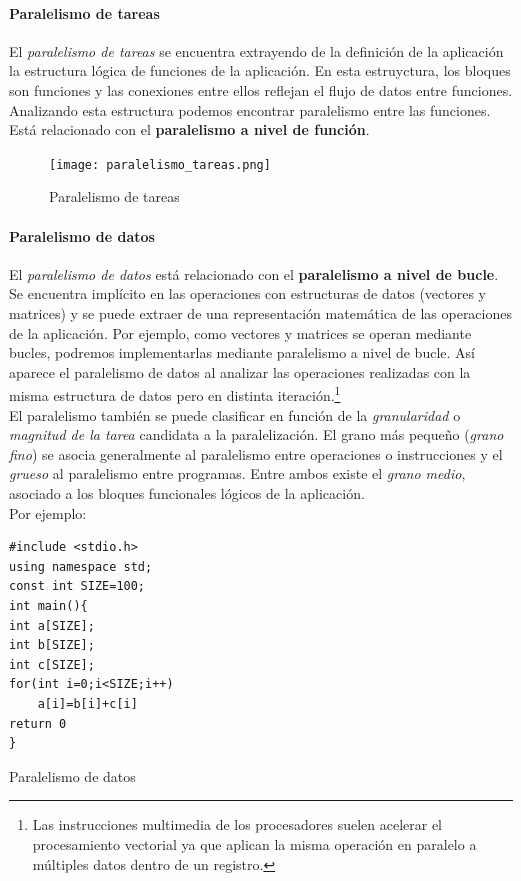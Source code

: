 \documentclass[12pt,spanish]{article}
\begin{document}
\paragraph{Paralelismo de tareas}

El \emph{paralelismo de tareas} se encuentra extrayendo de la definición de la aplicación la estructura lógica de funciones de la aplicación. En esta estruyctura, los bloques son funciones y las conexiones entre ellos reflejan el flujo de datos entre funciones. Analizando esta estructura podemos encontrar paralelismo entre las funciones.\\
Está relacionado con el \textbf{paralelismo a nivel de función}.
\begin{figure}[H]
\centering
\texttt{[image: paralelismo\_tareas.png]}
\caption{Paralelismo de tareas}
\end{figure}

\paragraph{Paralelismo de datos}

El \emph{paralelismo de datos} está relacionado con el \textbf{paralelismo a nivel de bucle}. Se encuentra implícito en las operaciones con estructuras de datos (vectores y matrices) y se puede extraer de una representación matemática de las operaciones de la aplicación. Por ejemplo, como vectores y matrices se operan mediante bucles, podremos implementarlas mediante paralelismo a nivel de bucle. Así aparece el paralelismo de datos al analizar las operaciones realizadas con la misma estructura de datos pero en distinta iteración.\footnote{Las instrucciones multimedia de los procesadores suelen acelerar el procesamiento vectorial ya que aplican la misma operación en paralelo a múltiples datos dentro de un registro.}\\
El paralelismo también se puede clasificar en función de la \emph{granularidad} o \emph{magnitud de la tarea} candidata a la paralelización. El grano más pequeño (\textit{grano fino}) se asocia generalmente al paralelismo entre operaciones o instrucciones y el \textit{grueso} al paralelismo entre programas. Entre ambos existe el \textit{grano medio}, asociado a los bloques funcionales lógicos de la aplicación.\\
Por ejemplo:
\begin{listing}[H]
\begin{verbatim}
#include <stdio.h>
using namespace std;
const int SIZE=100;
int main(){
int a[SIZE];
int b[SIZE];
int c[SIZE];
for(int i=0;i<SIZE;i++)
	a[i]=b[i]+c[i]
return 0
}
\end{verbatim}
\caption{Paralelismo de datos}
\end{listing}
\end{document}
